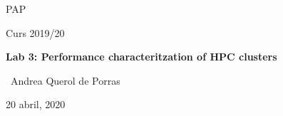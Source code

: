 \makeatletter

\begin{titlepage}
\thispagestyle{empty}
\begin{center}
	\centering
	\vspace{1cm}
	{\scshape\Large PAP \par}
	\vspace{0.75cm}
	{\Large Curs 2019/20 \par}
	\vspace{0.75cm} 
	{\huge\bfseries Lab 3: Performance characteritzation of HPC clusters \par}
	\vspace{1cm}
	{\Large\ Andrea Querol de Porras\par}
	\vspace{1cm}
    \vspace{0.5cm}
    

 \vfill
	{\large 20 abril, 2020\par}
\end{center}


\clearpage
\end{titlepage}
